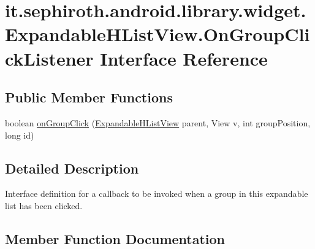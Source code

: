 \hypertarget{interfaceit_1_1sephiroth_1_1android_1_1library_1_1widget_1_1_expandable_h_list_view_1_1_on_group_click_listener}{}\section{it.\+sephiroth.\+android.\+library.\+widget.\+Expandable\+H\+List\+View.\+On\+Group\+Click\+Listener Interface Reference}
\label{interfaceit_1_1sephiroth_1_1android_1_1library_1_1widget_1_1_expandable_h_list_view_1_1_on_group_click_listener}
\subsection*{Public Member Functions}
\begin{DoxyCompactItemize}
\item 
boolean \hyperlink{interfaceit_1_1sephiroth_1_1android_1_1library_1_1widget_1_1_expandable_h_list_view_1_1_on_group_click_listener_abca5c7e46b8bac31daf2a0af5117f38a}{on\+Group\+Click} (\hyperlink{classit_1_1sephiroth_1_1android_1_1library_1_1widget_1_1_expandable_h_list_view}{Expandable\+H\+List\+View} parent, View v, int group\+Position, long id)
\end{DoxyCompactItemize}


\subsection{Detailed Description}
Interface definition for a callback to be invoked when a group in this expandable list has been clicked. 

\subsection{Member Function Documentation}
\mbox{\label{interfaceit_1_1sephiroth_1_1android_1_1library_1_1widget_1_1_expandable_h_list_view_1_1_on_group_click_listener_abca5c7e46b8bac31daf2a0af5117f38a}} 
